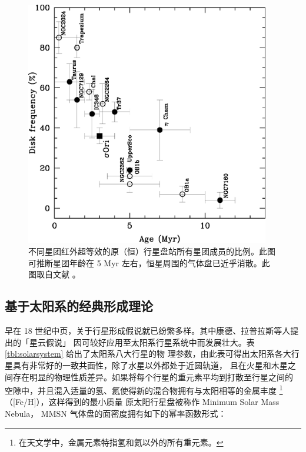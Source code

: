 \begin{figure}[t]
\centering
\includegraphics[width=0.95\textwidth]{figures/chapter1/fig10_pftimescale.eps}
\caption[不同星团红外超等效的原（恒）行星盘站所有星团成员的比例。此图可推断星团年龄老于10 Myr 后，恒星周围的气体盘已近乎完全消散。此图版权所有：Hern{\'a}ndez J. 等人。]{不同星团红外超等效的原（恒）行星盘站所有星团成员的比例。此图可推断星团年龄在 5 Myr 左右，恒星周围的气体盘已近乎消散。此图取自文献 。}
\label{fig:ysostage}
\end{figure}

\subsection{基于太阳系的经典形成理论} \label{sec:clspftheory}

早在 18 世纪中页，关于行星形成假说就已纷繁多样。其中康德、拉普拉斯等人提出的「星云假说」
因可较好应用至太阳系行星系统中而发展壮大。表\ref{tbl:solarsystem} 给出了太阳系八大行星的物
理参数，由此表可得出太阳系各大行星具有非常好的一致共面性，除了水星以外都处于近圆轨道，
且在火星和木星之间存在明显的物理性质差异。如果将每个行星的重元素平均到打散至行星之间的
空隙中，并且混入适量的氢、氦使得新的混合物拥有与太阳相等的金属丰度
\footnote{在天文学中，金属元素特指氢和氦以外的所有重元素。}（[Fe/H]），这样得到的最小质量
原太阳行星盘被称作 Minimum Solar Mass Nebula\cite{Weidenschilling1977,Hayashi1981}，
MMSN 气体盘的面密度拥有如下的幂率函数形式：

